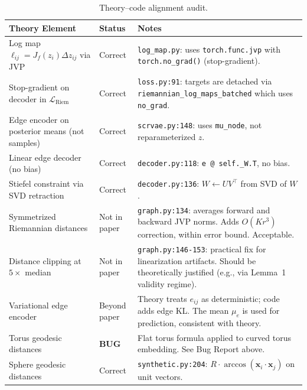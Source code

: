 \documentclass{article}
\begin{document}
\begin{table}[h]
\centering
\caption{Theory--code alignment audit.}
\label{tab:alignment}
\begin{tabular}{p{4.5cm}p{2cm}p{6cm}}
\toprule
\textbf{Theory Element} & \textbf{Status} & \textbf{Notes} \\
\midrule
Log map $\ell_{ij} = J_f(z_i)\Delta z_{ij}$ via JVP &
  \textcolor{green!60!black}{Correct} &
  \texttt{log\_map.py}: uses \texttt{torch.func.jvp} with
  \texttt{torch.no\_grad()} (stop-gradient). \\
\midrule
Stop-gradient on decoder in $\mathcal{L}_{\text{Riem}}$ &
  \textcolor{green!60!black}{Correct} &
  \texttt{loss.py:91}: targets are detached via
  \texttt{riemannian\_log\_maps\_batched} which uses \texttt{no\_grad}. \\
\midrule
Edge encoder on posterior means (not samples) &
  \textcolor{green!60!black}{Correct} &
  \texttt{scrvae.py:148}: uses \texttt{mu\_node}, not reparameterized $z$. \\
\midrule
Linear edge decoder (no bias) &
  \textcolor{green!60!black}{Correct} &
  \texttt{decoder.py:118}: \texttt{e @ self.\_W.T}, no bias. \\
\midrule
Stiefel constraint via SVD retraction &
  \textcolor{green!60!black}{Correct} &
  \texttt{decoder.py:136}: $W \leftarrow UV^\top$ from SVD of $W$. \\
\midrule
Symmetrized Riemannian distances &
  \textcolor{yellow!70!black}{Not in paper} &
  \texttt{graph.py:134}: averages forward and backward JVP norms.
  Adds $O(K r^3)$ correction, within error bound. Acceptable. \\
\midrule
Distance clipping at $5\times$ median &
  \textcolor{yellow!70!black}{Not in paper} &
  \texttt{graph.py:146-153}: practical fix for linearization artifacts.
  Should be theoretically justified (e.g., via Lemma~1 validity regime). \\
\midrule
Variational edge encoder &
  \textcolor{yellow!70!black}{Beyond paper} &
  Theory treats $e_{ij}$ as deterministic; code adds edge KL.
  The mean $\mu_e$ is used for prediction, consistent with theory. \\
\midrule
Torus geodesic distances &
  \textcolor{red!60!black}{\textbf{BUG}} &
  Flat torus formula applied to curved torus embedding.
  See Bug Report above. \\
\midrule
Sphere geodesic distances &
  \textcolor{green!60!black}{Correct} &
  \texttt{synthetic.py:204}: $R \cdot \arccos(\mathbf{x}_i \cdot \mathbf{x}_j)$
  on unit vectors. \\

\end{tabular}
\end{table}
\end{document}
